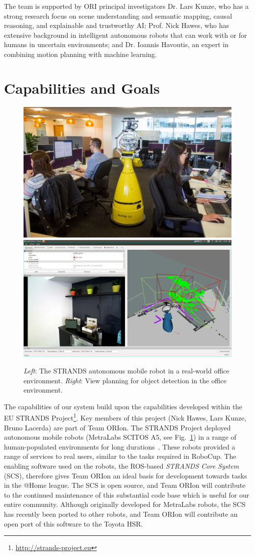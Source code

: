 \documentclass[runningheads,a4paper]{llncs}
\newcommand{\teamori}{Team ORIon}
\begin{document}
The team is supported by ORI principal investigators Dr. Lars Kunze, who has a strong research focus on scene understanding and semantic mapping, causal reasoning, and explainable and trustworthy AI; Prof. Nick Hawes, who has extensive background in intelligent autonomous robots that can work with or for humans in uncertain environments; and Dr. Ioannis Havoutis, an expert in combining motion planning with machine learning.

\section{Capabilities and Goals}

\begin{figure}[tb]
  \begin{center}
    \includegraphics[width=.43\columnwidth]{images/betty.jpg}
    \includegraphics[width=.55\columnwidth,clip,trim=10ex 20ex 10ex 20ex]{images/viewplanning_at_tsc.png}
  \end{center} 
  \vspace{-10pt}  
  \caption{\textit{Left}: The STRANDS autonomous mobile robot in a real-world
  office environment. \textit{Right}: View planning for object detection in the
  office environment.}
  \label{fig:mk}
  \vspace{-3ex}
\end{figure}

The capabilities of our system build upon the capabilities developed within the EU STRANDS Project\footnote{\url{http://strands-project.eu}}. Key members of this project (Nick Hawes, Lars Kunze, Bruno Lacerda) are part of \teamori. The STRANDS Project deployed autonomous mobile robots (MetraLabs SCITOS A5, see Fig.~\ref{fig:mk}) in a range of human-populated environments for long durations~\cite{strands@ram}. These robots provided a range of services to real users, similar to the tasks required in RoboCup. The enabling software used on the robots, the ROS-based \emph{STRANDS Core System} (SCS), therefore gives \teamori{} an ideal basis for development towards tasks in the @Home league. The SCS is open source, and \teamori{} will contribute to the continued maintenance of this substantial code base which is useful for our entire community. Although originally developed for MetraLabs robots, the SCS has recently been ported to other robots, and \teamori{} will contribute an open port of this software to the Toyota HSR. 
\end{document}
